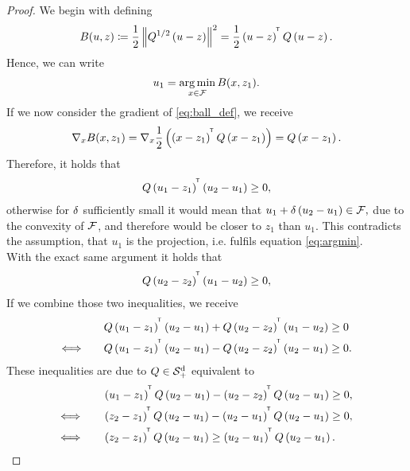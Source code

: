 \begin{proof}
We begin with defining
\begin{align}\label{eq:ball_def}
B(u,z) \coloneqq \frac{1}{2} \left\| Q^{1/2} \left( u - z \right) \right\|^2 = \frac{1}{2} \left( u - z \right)^{^{\mkern-1.5mu\mathsf{T}}} Q\left( u - z \right).
\end{align}\label{eq:argmin}
Hence, we can write
\begin{align}
u_1 = \operatorname*{arg\,min}_{x\in\operatorname{\mathcal{F}}} B(x, z_1).
\end{align}
If we now consider the gradient of \eqref{eq:ball_def}, we receive
\begin{align*}
\nabla_{x} B(x, z_1) = \nabla_{x} \frac{1}{2}\left( \left( x - z_1 \right)^{^{\mkern-1.5mu\mathsf{T}}} Q\left( x - z_1 \right) \right) = Q \left( x - z_1 \right).
\end{align*}
Therefore, it holds that
\begin{align*}
Q\left(u_1 - z_1 \right)^{^{\mkern-1.5mu\mathsf{T}}} \left( u_2 - u_1 \right) \geq 0,
\end{align*}
otherwise for $\delta$ sufficiently small it would mean that $u_1 + \delta \left( u_2 - u_1 \right) \in \operatorname{\mathcal{F}},$ due to the convexity of $\operatorname{\mathcal{F}}$, and therefore would be closer to $z_1$ than $u_1$. This contradicts the assumption, that $u_1$ is the projection, i.e. fulfils equation \eqref{eq:argmin}.\\
With the exact same argument it holds that
\begin{align*}
Q\left(u_2 - z_2 \right)^{^{\mkern-1.5mu\mathsf{T}}} \left( u_1 - u_2 \right) \geq 0,
\end{align*}
If we combine those two inequalities, we receive
\begin{align*}
&Q\left(u_1 - z_1 \right)^{^{\mkern-1.5mu\mathsf{T}}} \left( u_2 - u_1 \right) + Q\left(u_2 - z_2 \right)^{^{\mkern-1.5mu\mathsf{T}}} \left( u_1 - u_2 \right) \geq 0\\
\Longleftrightarrow \qquad &Q\left(u_1 - z_1 \right)^{^{\mkern-1.5mu\mathsf{T}}} \left( u_2 - u_1 \right) - Q\left(u_2 - z_2 \right)^{^{\mkern-1.5mu\mathsf{T}}} \left( u_2 - u_1 \right) \geq 0.
\end{align*}
These inequalities are due to $Q\in\operatorname{\mathcal{S}^d_{+}}$ equivalent to
\begin{align*}
&\left(u_1 - z_1 \right)^{\tran} Q \left( u_2 - u_1 \right) - \left(u_2 - z_2 \right)^{\tran} Q\left( u_2 - u_1 \right) \geq 0,\\
\Longleftrightarrow \qquad &\left(z_2 - z_1 \right)^{\tran} Q \left( u_2 - u_1 \right) - \left(u_2 - u_1 \right)^{\tran} Q\left( u_2 - u_1 \right) \geq 0,\\
\Longleftrightarrow \qquad &\left(z_2 - z_1 \right)^{\tran} Q \left( u_2 - u_1 \right) \geq \left(u_2 - u_1 \right)^{\tran} Q\left( u_2 - u_1 \right).

\end{align*}
\end{proof}
